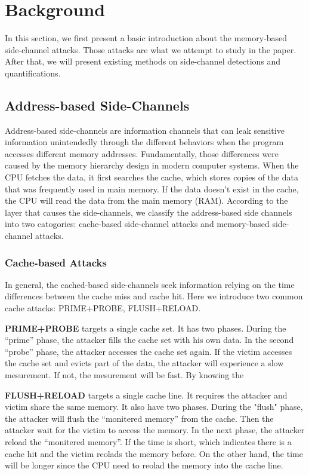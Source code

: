 \section{Background}
In this section, we first present a basic introduction about the 
memory-based side-channel attacks. Those attacks 
are what we attempt to study in the paper. After that, we 
will present existing methods on side-channel detections and quantifications.

\subsection{Address-based Side-Channels}
Address-based side-channels are information channels that can 
leak sensitive information unintendedly through the different 
behaviors when the program accesses different memory addresses. 
Fundamentally, those differences were caused by the memory hierarchy design 
in modern computer systems. When the CPU fetches the data, it first searches
the cache, which stores copies of the data that was 
frequently used in main memory. If the data doesn't exist in the cache, 
the CPU will read the data from the main memory (RAM). 
According to the layer that causes the side-channels, we classify
the address-based side channels into two catogories: 
cache-based side-channel attacks and memory-based side-channel attacks.

\subsubsection{Cache-based Attacks}
In general, the cached-based side-channels seek 
information relying on the time differences between the cache miss
and cache hit. Here we introduce two common cache attacks:
PRIME+PROBE, FLUSH+RELOAD.

\textbf{PRIME+PROBE} targets a single cache set. It has two phases. During the
``prime'' phase, the attacker fills the cache set with his own data.
In the second ``probe'' phase, the attacker accesses the cache set
again. If the victim accesses the cache set and evicts part of 
the data, the attacker will experience a slow mesurement. If not, 
the mesurement will be fast. By knowing the 

\textbf{FLUSH+RELOAD} targets a single cache line. 
It requires the attacker and victim share the same memory.
It also have two phases. During the "flush" phase, the attacker 
will flush the ``monitered memory'' from the cache. Then the attacker
wait for the victim to access the memory. In the next phase, the 
attacker reload the ``monitered memory''. If the time is short, which
indicates there is a cache hit and the victim reolads the memory before. 
On the other hand, the time will be longer since the CPU need to reolad
the memory into the cache line. 

